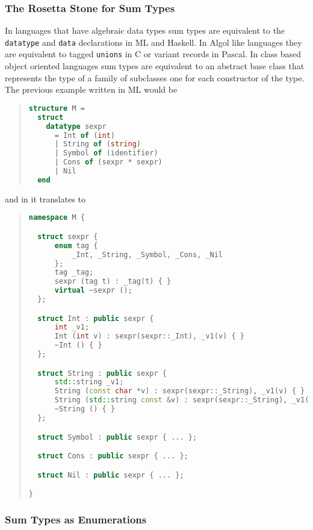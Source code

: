 \subsubsection{The Rosetta Stone for Sum Types}
\label{sec:rosetta-stone}

In languages that have algebraic data types sum types are equivalent to the
\lstinline[language=ASDL]!datatype! and \lstinline[language=ASDL]!data! declarations in ML and Haskell. In Algol like
languages they are equivalent to tagged \lstinline[language=ASDL]!unions! in C or variant records
in Pascal. In class based object oriented languages sum types are equivalent
to an abstract base class that represents the type of a family of subclasses
one for each constructor of the type. The previous example written in ML would
be
\begin{quote}\begin{lstlisting}[language=SML]
structure M =
  struct
    datatype sexpr
      = Int of (int)
      | String of (string)
      | Symbol of (identifier)
      | Cons of (sexpr * sexpr)
      | Nil
  end
\end{lstlisting}\end{quote}%
and in \Cplusplus{} it translates to
\begin{quote}\begin{lstlisting}[language=c++]
namespace M {

  struct sexpr {
      enum tag {
          _Int, _String, _Symbol, _Cons, _Nil
      };
      tag _tag;
      sexpr (tag t) : _tag(t) { }
      virtual ~sexpr ();
  };

  struct Int : public sexpr {
      int _v1;
      Int (int v) : sexpr(sexpr::_Int), _v1(v) { }
      ~Int () { }
  };

  struct String : public sexpr {
      std::string _v1;
      String (const char *v) : sexpr(sexpr::_String), _v1(v) { }
      String (std::string const &v) : sexpr(sexpr::_String), _v1(v) { }
      ~String () { }
  };

  struct Symbol : public sexpr { ... };

  struct Cons : public sexpr { ... };

  struct Nil : public sexpr { ... };

}
\end{lstlisting}\end{quote}%

\subsubsection{Sum Types as Enumerations}
\label{sec:enumerations}

